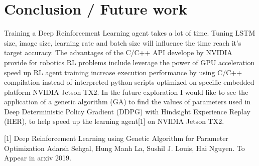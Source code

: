 \documentclass[10pt,journal,compsoc]{IEEEtran}
\begin{document}
\section{Conclusion / Future work}
Training a Deep Reinforcement Learning agent takes a lot of time. Tuning LSTM size, image size, learning rate and batch size will influence the time reach it's target accuracy. The advantages of the C/C++ API develope by NVIDIA provide for robotics RL problems include leverage the power of GPU acceleration speed up RL agent training increase execution performance by using C/C++ compilation instead of interpreted python scripts optimized on specific embedded platform NVIDIA Jetson TX2. In the future exploration I would like to see the application of a genetic algorithm (GA) to find the values of parameters used in Deep Deterministic Policy Gradient (DDPG) with Hindsight Experience Replay (HER), to help speed up the learning agent[1] on NVIDIA Jetson TX2.




[1] Deep Reinforcement Learning using Genetic
Algorithm for Parameter Optimization
Adarsh Sehgal, Hung Manh La, Sushil J. Louis, Hai Nguyen. To Appear in arxiv 2019.
\end{document}
